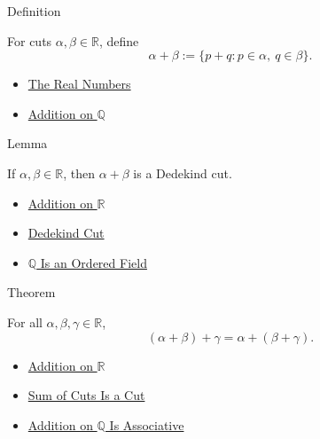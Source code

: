\begin{definitionbox}{Definition}
\begin{definition}
\label{def:addition-on-r}
For cuts $\alpha,\beta\in\mathbb{R}$, define
\[
\alpha+\beta:=\{p+q:p\in\alpha,\ q\in\beta\}.
\]
\end{definition}
\end{definitionbox}

\begin{dependencies}
\begin{itemize}
  \item \hyperref[def:reals]{The Real Numbers}
  \item \hyperref[def:addition-on-q-classes]{Addition on $\mathbb{Q}$}
\end{itemize}
\end{dependencies}

\begin{lemmabox}{Lemma}
\begin{lemma}
\label{lem:sum-of-cuts-is-a-cut}
If $\alpha,\beta\in\mathbb{R}$, then $\alpha+\beta$ is a Dedekind cut.
\end{lemma}
\end{lemmabox}

\begin{dependencies}
\begin{itemize}
  \item \hyperref[def:addition-on-r]{Addition on $\mathbb{R}$}
  \item \hyperref[def:dedekind-cut]{Dedekind Cut}
  \item \hyperref[thm:q-is-an-ordered-field]{$\mathbb{Q}$ Is an Ordered Field}
\end{itemize}
\end{dependencies}

\begin{theorembox}{Theorem}
\begin{theorem}
\label{thm:addition-on-r-associative}
For all $\alpha,\beta,\gamma\in\mathbb{R}$,
\[
(\alpha+\beta)+\gamma=\alpha+(\beta+\gamma).
\]
\end{theorem}
\end{theorembox}

\begin{dependencies}
\begin{itemize}
  \item \hyperref[def:addition-on-r]{Addition on $\mathbb{R}$}
  \item \hyperref[lem:sum-of-cuts-is-a-cut]{Sum of Cuts Is a Cut}
  \item \hyperref[thm:addition-on-q-associative]{Addition on $\mathbb{Q}$ Is Associative}
\end{itemize}
\end{dependencies}

